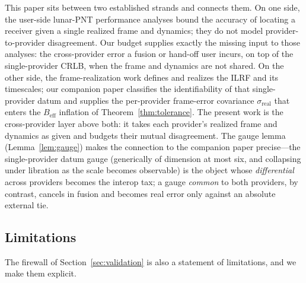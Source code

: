 This paper sits between two established strands and connects them. On one side, the
user-side lunar-PNT performance analyses \citep{pohlmann2025hybrid,iiyama2023lupnt}
bound the accuracy of locating a receiver given a single realized frame and dynamics;
they do not model provider-to-provider disagreement. Our budget supplies exactly the
missing input to those analyses: the cross-provider error a fusion or hand-off user
incurs, on top of the single-provider CRLB, when the frame and dynamics are not
shared. On the other side, the frame-realization work \citep{sosnica2025ilrf,%
fienga2024moonlight} defines and realizes the ILRF and its timescales; our companion
paper \citep{baweja2026datum} classifies the identifiability of that single-provider
datum and supplies the per-provider frame-error covariance
$\sigma_{\mathrm{real}}$ that enters the $B_{\mathrm{eff}}$ inflation of
Theorem~\ref{thm:tolerance}. The present work is the cross-provider layer above both:
it takes each provider's realized frame and dynamics as given and budgets their
mutual disagreement. The gauge lemma (Lemma~\ref{lem:gauge}) makes the connection to
the companion paper precise---the single-provider datum gauge (generically of
dimension at most six, and collapsing under libration as the scale becomes observable)
is the object whose \emph{differential} across providers becomes the interop tax; a
gauge \emph{common} to both providers, by contrast, cancels in fusion and becomes real
error only against an absolute external tie.

\subsection{Limitations}
\label{sec:limitations}

The firewall of Section~\ref{sec:validation} is also a statement of limitations, and
we make them explicit.

